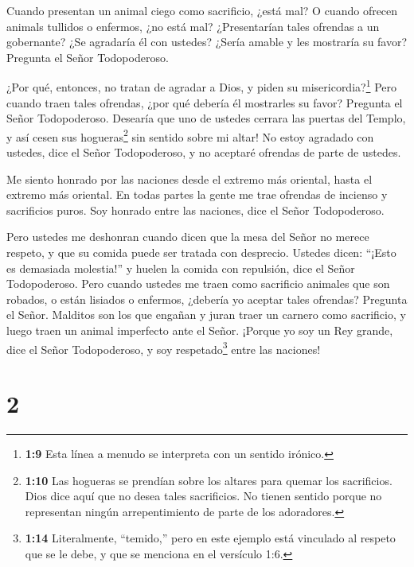  Cuando presentan un animal ciego como sacrificio, ¿está
mal? O cuando ofrecen animals tullidos o enfermos, ¿no está mal?
¿Presentarían tales ofrendas a un gobernante? ¿Se agradaría él con
ustedes? ¿Sería amable y les mostraría su favor? Pregunta el Señor
Todopoderoso.

 ¿Por qué, entonces, no tratan de agradar a Dios, y piden su
misericordia?\footnote{\textbf{1:9} Esta línea a menudo se interpreta
  con un sentido irónico.} Pero cuando traen tales ofrendas, ¿por qué
debería él mostrarles su favor? Pregunta el Señor Todopoderoso.
 Desearía que uno de ustedes cerrara las puertas del
Templo, y así cesen sus hogueras\footnote{\textbf{1:10} Las hogueras se
  prendían sobre los altares para quemar los sacrificios. Dios dice aquí
  que no desea tales sacrificios. No tienen sentido porque no
  representan ningún arrepentimiento de parte de los adoradores.} sin
sentido sobre mi altar! No estoy agradado con ustedes, dice el Señor
Todopoderoso, y no aceptaré ofrendas de parte de ustedes.

 Me siento honrado por las naciones desde el extremo más
oriental, hasta el extremo más oriental. En todas partes la gente me
trae ofrendas de incienso y sacrificios puros. Soy honrado entre las
naciones, dice el Señor Todopoderoso.

 Pero ustedes me deshonran cuando dicen que la mesa del
Señor no merece respeto, y que su comida puede ser tratada con
desprecio.  Ustedes dicen: ``¡Esto es demasiada molestia!''
y huelen la comida con repulsión, dice el Señor Todopoderoso. Pero
cuando ustedes me traen como sacrificio animales que son robados, o
están lisiados o enfermos, ¿debería yo aceptar tales ofrendas? Pregunta
el Señor.  Malditos son los que engañan y juran traer un
carnero como sacrificio, y luego traen un animal imperfecto ante el
Señor. ¡Porque yo soy un Rey grande, dice el Señor Todopoderoso, y soy
respetado\footnote{\textbf{1:14} Literalmente, ``temido,'' pero en este
  ejemplo está vinculado al respeto que se le debe, y que se menciona en
  el versículo 1:6.} entre las naciones!

\hypertarget{section-1}{%
\section{2}\label{section-1}}


